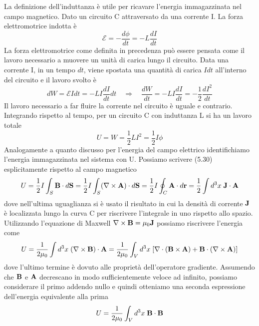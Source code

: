 La definizione dell'induttanza \`e utile per ricavare l'energia immagazzinata nel campo magnetico. Dato un circuito C attraversato da una corrente I. La forza elettromotrice indotta \`e
\begin{equation*}
	\mathcal{E} =  - \frac{d \phi}{dt} = -L \frac{dI}{dt}
\end{equation*} 
La forza elettromotrice come definita in precedenza pu\`o essere pensata come il lavoro necessario a muovere un unit\`a di carica lungo il circuito. Data una corrente I, in un tempo $dt$, viene spostata una quantit\`a di carica $Idt$ all'interno del circuito e il lavoro svolto \`e 
\begin{equation*}
	dW = \mathcal{E}Idt=-L I \frac{dI}{dt}dt \quad \Rightarrow \quad \frac{dW}{dt} = -LI \frac{dI}{dt} = -\frac{1}{2}\frac{d I^2}{dt}
\end{equation*}
Il lavoro necessario a far fluire la corrente nel circuito \`e uguale e contrario. Integrando rispetto al tempo, per un circuito C con induttanza L si ha un lavoro totale 
\begin{equation}
	U = W = \frac{1}{2}L I^2 = \frac{1}{2}I \phi
\end{equation}
Analogamente a quanto discusso per l'energia del campo elettrico identifichiamo l'energia immagazzinata nel sistema con U. Possiamo scrivere (5.30) esplicitamente rispetto al campo magnetico
\begin{equation*}
	U = \frac{1}{2} I \int_{S} \bold{B} \cdot d\bold{S} = \frac{1}{2}I \int_{S} (\nabla \times \bold{A}) \cdot d\bold{S} = \frac{1}{2}I \oint_{C} \bold{A} \cdot d \bold{r} = \frac{1}{2} \int d^3x \;\bold{J} \cdot \bold{A}
\end{equation*} 
dove nell'ultima uguaglianza si \`e usato il risultato in cui la densit\`a di corrente $\bold{J}$ \`e localizzata lungo la curva C per riscrivere l'integrale in uno rispetto allo spazio. Utilizzando l'equazione di Maxwell $\nabla \times \bold{B} = \mu_0 \bold{J}$ possiamo riscrivere l'energia come 
\begin{equation*}
	U = \frac{1}{2 \mu_0} \int d^3x \; (\nabla \times \bold{B}) \cdot \bold{A} = \frac{1}{2 \mu_0} \int_{V} d^3x \; [\nabla \cdot (\bold{B} \times \bold{A} ) + \bold{B} \cdot (\nabla \times \bold{A})]
\end{equation*}
dove l'ultimo termine \`e dovuto alle propriet\`a dell'operatore gradiente. Assumendo che $\bold{B}$ e $\bold{A}$ decrescano in modo sufficientemente veloce ad infinito, possiamo considerare il primo addendo nullo e quindi otteniamo una seconda espressione dell'energia equivalente alla prima 
\begin{equation}
	U = \frac{1}{2 \mu_0} \int_{V} d^3 x \; \bold{B} \cdot \bold{B}
\end{equation}

